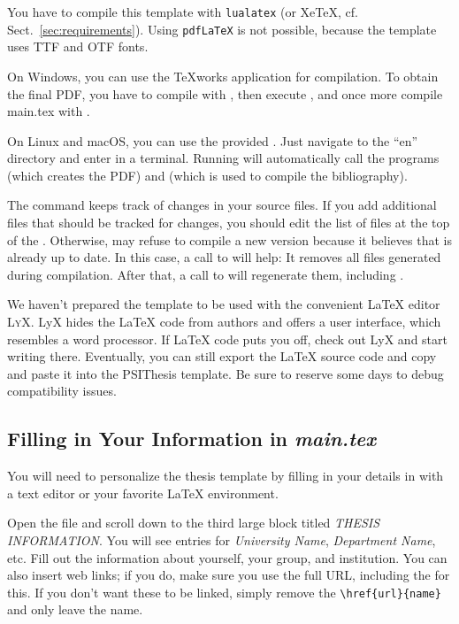 You have to compile this template with \texttt{lualatex} (or XeTeX, cf. Sect.~\ref{sec:requirements}). Using \texttt{pdfLaTeX} is not possible, because the template uses TTF and OTF fonts.

On Windows, you can use the TeXworks application for compilation. To obtain the final PDF, you have to compile  with , then execute , and once more compile main.tex with .

On Linux and macOS, you can use the provided .
Just navigate to the ``en'' directory and enter  in a terminal. Running  will automatically call the programs  (which creates the PDF) and  (which is used to compile the bibliography).

The  command keeps track of changes in your source files. If you add additional files that should be tracked for changes, you should edit the list of files at the top of the . Otherwise,  may refuse to compile a new version because it believes that  is already up to date. In this case, a call to  will help: It removes all files generated during compilation. After that, a call to  will regenerate them, including .


We haven't prepared the template to be used with the convenient LaTeX editor \textsc{LyX}. LyX hides the LaTeX code from authors and offers a user interface, which resembles a word processor. If LaTeX code puts you off, check out LyX and start writing there. Eventually, you can still export the LaTeX source code and copy and paste it into the PSIThesis template. Be sure to reserve some days to debug compatibility issues.

\subsection{Filling in Your Information in \emph{main.tex}}\label{sec:fillingdetails}

You will need to personalize the thesis template by filling in your details in  with a text editor or your favorite LaTeX environment.

Open the file and scroll down to the third large block titled \emph{THESIS INFORMATION}. You will see entries for \emph{University Name}, \emph{Department Name}, etc. Fill out the information about yourself, your group, and institution.%
You can also insert web links; if you do, make sure you use the full URL, including the  for this. If you don't want these to be linked, simply remove the \verb|\href{url}{name}| and only leave the name.

